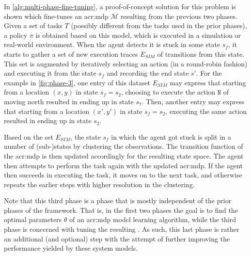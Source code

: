 In \autoref{alg:multi-phase-fine-tuning}, a proof-of-concept solution for this problem is shown which fine-tunes an \acrshort{acr:mdp} $\mathcal{M}$ resulting from the previous two phases.
Given a set of tasks $T$ (possibly different from the tasks used in the prior phases), a policy $\pi$ is obtained based on this model, which is executed in a simulation or real-world environment.
When the agent detects it is stuck in some state $s_f$, it starts to gather a set of new execution traces $E_\mathit{SIM}$ of transitions from this state.
This set is augmented by iteratively selecting an action (in a round-robin fashion) and executing it from the state $s_f$ and recording the end state $s'$.
For the example in \autoref{fig:phase-3}, one entry of this dataset $E_\mathit{SIM}$ may express that starting from a location $(x, y)$ in state $s_f = s_2$, choosing to execute the action $\texttt{N}$ of moving north resulted in ending up in state $s_7$.
Then, another entry may express that starting from a location $(x', y')$ in state $s_f = s_2$, executing the same action resulted in ending up in state $s_2$.

Based on the set $E_\mathit{SIM}$, the state $s_f$ in which the agent got stuck is split in a number of \mbox{(sub-)states} by clustering the observations.
The transition function of the \acrshort{acr:mdp} is then updated accordingly for the resulting state space.
The agent then attempts to perform the task again with the updated \acrshort{acr:mdp}.
If the agent then succeeds in executing the task, it moves on to the next task, and otherwise repeats the earlier steps with higher resolution in the clustering.

Note that this third phase is a phase that is mostly independent of the prior phases of the framework.
That is, in the first two phases the goal is to find the optimal parameters $\theta$ of an \acrshort{acr:mdp} model learning algorithm, while the third phase is concerned with tuning the resulting .
As such, this last phase is rather an additional (and optional) step with the attempt of further improving the performance yielded by these system models.



